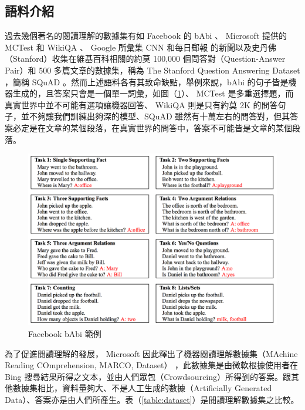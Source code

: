 \subsection{語料介紹}
過去幾個著名的閱讀理解的數據集有如 Facebook 的 bAbi \cite{weston2015towards}  、 Microsoft 提供的 MCTest \cite{richardson2013mctest} 和 WikiQA \cite{yang2015wikiqa} 、 Google 所彙集 CNN 和每日郵報 \cite{hermann2015teaching} 的新聞以及史丹佛（Stanford）收集在維基百科相關的約莫 100,000 個問答對（Question-Answer Pair）和 500 多篇文章的數據集，稱為 The Stanford Question Answering Dataset ，簡稱 SQuAD \cite{rajpurkar2016squad} 。然而上述語料各有其致命缺點，舉例來說，bAbi 的句子皆是機器生成的，且答案只會是一個單一詞彙，如圖（\ref{fig:babi}）、 MCTest 是多重選擇題，而真實世界中並不可能有選項讓機器回答、 WikiQA 則是只有約莫 2K 的問答句子，並不夠讓我們訓練出夠深的模型、SQuAD 雖然有十萬左右的問答對，但其答案必定是在文章的某個段落，在真實世界的問答中，答案不可能皆是文章的某個段落。

\begin{figure}[h]
    \includegraphics[scale=0.6]{images/chap2_babi.png}
    \caption{Facebook bAbi 範例}\label{fig:babi}
\end{figure}

為了促進閱讀理解的發展， Microsoft 因此釋出了機器閱讀理解數據集（MAchine Reading COmprehension, MARCO, Dataset）\cite{nguyen2016ms} ，此數據集是由微軟根據使用者在 Bing 搜尋結果所得之文本，並由人們眾包（Crowdsourcing）所得到的答案。跟其他數據集相比，資料量夠大、不是人工生成的數據（Artificially Generated Data）、答案亦是由人們所產生。表（\ref{table:dataset}）是閱讀理解數據集之比較。

